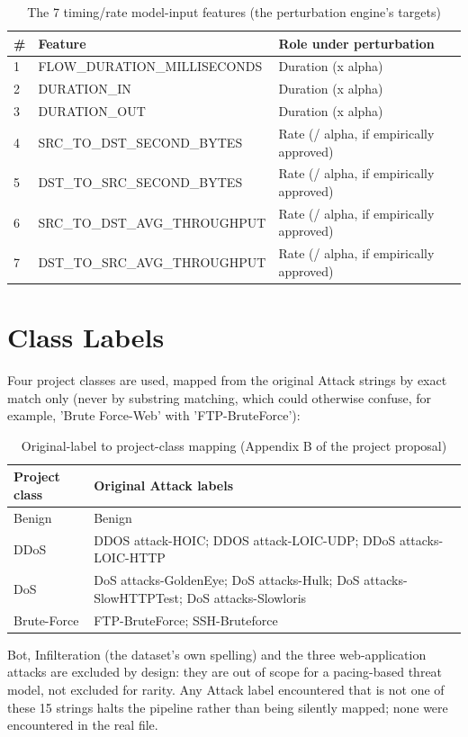 \documentclass[12pt,a4paper]{report}
\begin{document}
\begin{table}[h]\centering
\caption{The 7 timing/rate model-input features (the perturbation engine's targets)}
\begin{tabularx}{\linewidth}{XXX}
\toprule
\textbf{\#} & \textbf{Feature} & \textbf{Role under perturbation} \\
\midrule
1 & FLOW\_DURATION\_MILLISECONDS & Duration (x alpha) \\
2 & DURATION\_IN & Duration (x alpha) \\
3 & DURATION\_OUT & Duration (x alpha) \\
4 & SRC\_TO\_DST\_SECOND\_BYTES & Rate (/ alpha, if empirically approved) \\
5 & DST\_TO\_SRC\_SECOND\_BYTES & Rate (/ alpha, if empirically approved) \\
6 & SRC\_TO\_DST\_AVG\_THROUGHPUT & Rate (/ alpha, if empirically approved) \\
7 & DST\_TO\_SRC\_AVG\_THROUGHPUT & Rate (/ alpha, if empirically approved) \\
\bottomrule
\end{tabularx}
\end{table}
\section{Class Labels}
Four project classes are used, mapped from the original Attack strings by exact match only (never by substring matching, which could otherwise confuse, for example, 'Brute Force-Web' with 'FTP-BruteForce'):

\begin{table}[h]\centering
\caption{Original-label to project-class mapping (Appendix B of the project proposal)}
\begin{tabularx}{\linewidth}{XX}
\toprule
\textbf{Project class} & \textbf{Original Attack labels} \\
\midrule
Benign & Benign \\
DDoS & DDOS attack-HOIC; DDOS attack-LOIC-UDP; DDoS attacks-LOIC-HTTP \\
DoS & DoS attacks-GoldenEye; DoS attacks-Hulk; DoS attacks-SlowHTTPTest; DoS attacks-Slowloris \\
Brute-Force & FTP-BruteForce; SSH-Bruteforce \\
\bottomrule
\end{tabularx}
\end{table}
Bot, Infilteration (the dataset's own spelling) and the three web-application attacks are excluded by design: they are out of scope for a pacing-based threat model, not excluded for rarity. Any Attack label encountered that is not one of these 15 strings halts the pipeline rather than being silently mapped; none were encountered in the real file.
\end{document}
